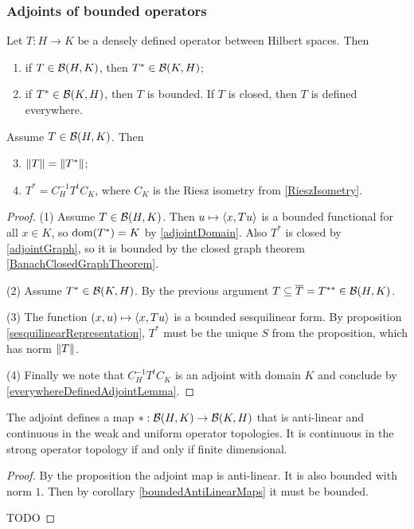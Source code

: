 \subsubsection{Adjoints of bounded operators}
\begin{proposition}
Let $T: H\to K$ be a densely defined operator between Hilbert spaces. Then
\begin{enumerate}
\item if $T\in\operatorname{\mathcal{B}}(H,K)$, then $T^*\in\operatorname{\mathcal{B}}(K,H)$;
\item if $T^*\in\operatorname{\mathcal{B}}(K,H)$, then $T$ is bounded. If $T$ is closed, then $T$ is defined everywhere.
\end{enumerate}
Assume $T\in\operatorname{\mathcal{B}}(H,K)$. Then
\begin{enumerate} \setcounter{enumi}{2}
\item $\lVert T\rVert = \lVert T^*\rVert$;
\item $T^* = C_H^{-1}T^tC_K$, where $C_K$ is the Riesz isometry from \ref{RieszIsometry}.
\end{enumerate}
\end{proposition}
\begin{proof}
(1) Assume $T\in\operatorname{\mathcal{B}}(H,K)$. Then $u\mapsto \left\langle x,Tu \right\rangle$ is a bounded functional for all $x\in K$, so $\operatorname{dom}(T^*) = K$ by \ref{adjointDomain}. Also $T^*$ is closed by \ref{adjointGraph}, so it is bounded by the closed graph theorem \ref{BanachClosedGraphTheorem}.

(2) Assume $T^*\in\operatorname{\mathcal{B}}(K,H)$. By the previous argument $T \subseteq \overline{T} = T^{**}\in\operatorname{\mathcal{B}}(H,K)$.

(3) The function $(x,u)\mapsto \left\langle x,Tu \right\rangle$ is a bounded sesquilinear form. By proposition \ref{sesquilinearRepresentation}, $T^*$ must be the unique $S$ from the proposition, which has norm $\lVert T\rVert$.

(4) Finally we note that $C_H^{-1}T^tC_K$ is an adjoint with domain $K$ and conclude by \ref{everywhereDefinedAdjointLemma}.
\end{proof}

\begin{lemma}
The adjoint defines a map $*:\operatorname{\mathcal{B}}(H,K)\to \operatorname{\mathcal{B}}(K,H)$ that is anti-linear and continuous in the weak and uniform operator topologies. It is continuous in the strong operator topology \textup{if and only if} finite dimensional.
\end{lemma}
\begin{proof}
By the proposition the adjoint map is anti-linear. It is also bounded with norm $1$. Then by corollary \ref{boundedAntiLinearMaps} it must be bounded.

TODO
\end{proof}

